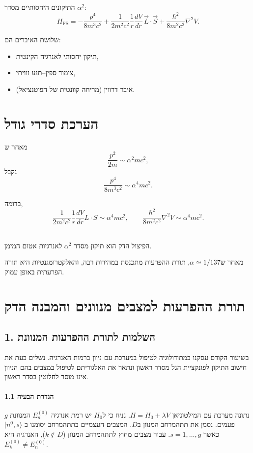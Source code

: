 התיקונים היחסותיים מסדר $\alpha^2$:
\[
H_{\mathrm{FS}}
=
-\frac{p^4}{8m^3c^2}
+
\frac{1}{2m^2c^2}\frac{1}{r}\frac{dV}{dr}\,\vec L\cdot\vec S
+
\frac{\hbar^2}{8m^2c^2}\nabla^2 V.
\]

שלושת האיברים הם:
\begin{itemize}
\item תיקון יחסותי לאנרגיה הקינטית,
\item צימוד ספין–תנע זוויתי,
\item איבר דרווין (מריחה קוונטית של הפוטנציאל).
\end{itemize}



\section{הערכת סדרי גודל}

מאחר ש
\[
\frac{p^2}{2m} \sim \alpha^2 mc^2,
\]
נקבל
\[
\frac{p^4}{8m^3c^2} \sim \alpha^4 mc^2.
\]

בדומה,
\[
\frac{1}{2m^2c^2}\frac{1}{r}\frac{dV}{dr} L\cdot S
\sim
\alpha^4 mc^2,
\qquad
\frac{\hbar^2}{8m^2c^2}\nabla^2 V
\sim
\alpha^4 mc^2.
\]

\begin{resultbox}
\\
הפיצול הדק הוא תיקון מסדר $\alpha^2$ לאנרגיות אטום המימן.
\end{resultbox}

מאחר ש$\alpha \simeq 1/137$, תורת ההפרעות מתכנסת במהירות רבה, והאלקטרומגנטיות היא תורה הפרעתית באופן עמוק.
\section*{תורת ההפרעות למצבים מנוונים והמבנה הדק}

\subsection*{1. השלמות לתורת ההפרעות המנוונת}
בשיעור הקודם עסקנו במתודולוגיה לטיפול במערכת עם ניוון ברמות האנרגיה. נשלים כעת את חישוב התיקון לפונקציית הגל מסדר ראשון ונתאר את האלגוריתם לטיפול במצבים בהם הניוון אינו מוסר לחלוטין בסדר ראשון.

\paragraph{1.1 הגדרת הבעיה}
נתונה מערכת עם המילטוניאן $H = H_0 + \lambda V$. נניח כי ל$H_0$ יש רמת אנרגיה $E_n^{(0)}$ המנוונת $g$ פעמים. נסמן את תתהמרחב המנוון ב$D$.
המצבים העצמיים בתתהמרחב יסומנו ב $|n^0, s\rangle$ כאשר $s=1,\dots,g$.
עבור מצבים מחוץ לתתהמרחב המנוון ($k \notin D$), האנרגיה היא $E_k^{(0)} \neq E_n^{(0)}$.

